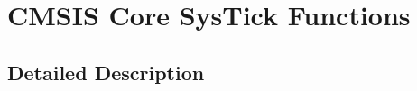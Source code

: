 \hypertarget{group___c_m_s_i_s___core___sys_tick_functions}{\section{C\-M\-S\-I\-S Core Sys\-Tick Functions}
\label{group___c_m_s_i_s___core___sys_tick_functions}
}


\subsection{Detailed Description}
